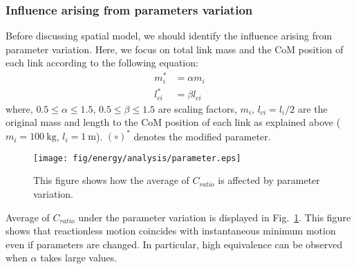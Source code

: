 \documentclass[preprint,12pt]{elsarticle}
\def\fig#1{{Fig.~\ref{fig:#1}}}
\def\unit#1{{~\mathrm{#1}}}
\begin{document}
\subsubsection{Influence arising from parameters variation}
Before discussing spatial model,
we should identify the influence arising from parameter variation.
Here, we focus on total link mass and the CoM position of each link according to the following equation:
%
\begin{align}
  m_{i}^{*} &= \alpha m_{i}\\
  l^{*}_{ci} &= \beta l_{ci}
\end{align}
%
where, $0.5 \leq \alpha \leq 1.5$,
$0.5 \leq \beta \leq 1.5$ are scaling factors,
$m_{i}$,
$l_{ci} = l_{i}/2$ are the original mass and length to the CoM position of each link as explained above ($m_{i} = 100\unit{kg}$, $l_{i} = 1\unit{m}$).
$(\circ)^{*}$ denotes the modified parameter.
%
\begin{figure}[t]
  \centering
  \texttt{[image: fig/energy/analysis/parameter.eps]}
  \vspace{-2em}
  \caption{This figure shows how the average of $C_{ratio}$ is affected by parameter variation.}
  \label{fig:parameter}
\end{figure}
%
Average of $C_{ratio}$ under the parameter variation is displayed in \fig{parameter}.
This figure shows that reactionless motion coincides
with instantaneous minimum motion even if parameters are changed.
In particular, high equivalence can be observed when $\alpha$ takes large values.



\end{document}

